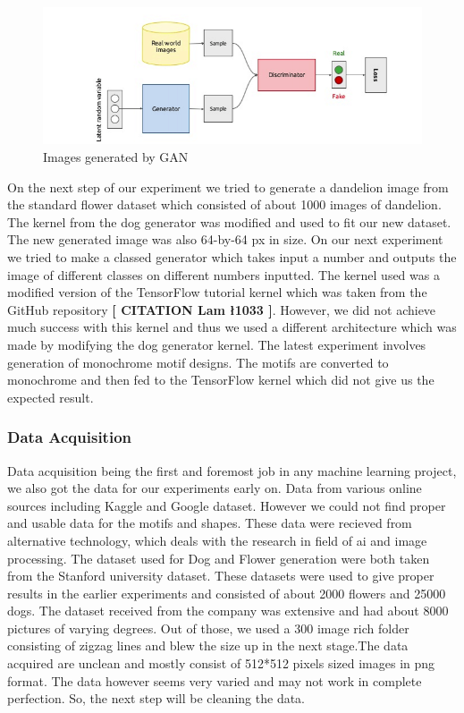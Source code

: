 \documentclass{article}
\begin{document}
    \begin{figure}[H]
        \centering
        \includegraphics[scale=0.5]{images/GAN/basicGAN.png}
        \caption{Images generated by GAN}
    \end{figure}
    On the next step of our experiment we tried to generate a dandelion image from the standard flower dataset which consisted of about 1000 images of dandelion. The kernel from the dog generator was modified and used to fit our new dataset. The new generated image was also 64-by-64 px in size.
    On our next experiment we tried to make a classed generator which takes input a number and outputs the image of different classes on different numbers inputted. The kernel used was a modified version of the TensorFlow tutorial kernel which was taken from the GitHub repository \textbf{[ CITATION Lam \l 1033 ]}. However, we did not achieve much success with this kernel and thus we used a different architecture which was made by modifying the dog generator kernel.
    The latest experiment involves generation of monochrome motif designs. The motifs are converted to monochrome and then fed to the TensorFlow kernel which did not give us the expected result.
     \subsubsection{Data Acquisition}
    Data acquisition being the first and foremost job in any machine learning project, we also got the data for our experiments early on. Data from various online sources including Kaggle and Google dataset. However we could not find proper and usable data for the motifs and shapes. These data were recieved from alternative technology, which deals with the research in field of ai and image processing.
    The dataset used for Dog and Flower generation were both taken from the Stanford university dataset. These datasets were used to give proper results in the earlier experiments and consisted of about 2000 flowers and 25000 dogs.
    The dataset received from the company was extensive and had about 8000 pictures of varying degrees. Out of those, we used a 300 image rich folder consisting of zigzag lines and blew the size up in the next stage.The data acquired are unclean and mostly consist of 512*512 pixels sized images in png format. The data however seems very varied and may not work in complete perfection. So, the next step will be cleaning the data.
    
\end{document}
